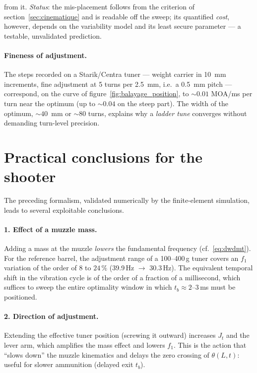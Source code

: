 \documentclass[12pt,a4paper]{article}
\begin{document}
from it. \emph{Status}: the mis-placement follows from the criterion of section~\ref{sec:cinematique} and is readable off the sweep; its quantified \emph{cost}, however, depends on the variability model and its least secure parameter --- a testable, unvalidated prediction.

	\paragraph{Fineness of adjustment.} The steps recorded on a Starik/Centra tuner --- weight carrier in 10~mm increments, fine adjustment at 5 turns per 2.5~mm, i.e.\ a 0.5~mm pitch --- correspond, on the curve of figure~\ref{fig:balayage_position}, to $\sim 0.01$ MOA/ms per turn near the optimum (up to $\sim 0.04$ on the steep part). The width of the optimum, $\sim 40$~mm or $\sim 80$ turns, explains why a \emph{ladder tune} converges without demanding turn-level precision.

	\section{Practical conclusions for the shooter}
	\label{sec:conclusions}

	The preceding formalism, validated numerically by the finite-element simulation, leads to several exploitable conclusions.

	\paragraph{1. Effect of a muzzle mass.} Adding a mass at the muzzle \emph{lowers} the fundamental frequency (cf.\ \eqref{eq:dwdmt}). For the reference barrel, the adjustment range of a 100--400\,g tuner covers an $f_1$ variation of the order of $8$ to $24\,\%$ (39.9\,Hz $\to$ 30.3\,Hz). The equivalent temporal shift in the vibration cycle is of the order of a fraction of a millisecond, which suffices to sweep the entire optimality window in which $t_b \approx 2$--$3$\,ms must be positioned.

	\paragraph{2. Direction of adjustment.} Extending the effective tuner position (screwing it outward) increases $J_t$ and the lever arm, which amplifies the mass effect and lowers $f_1$. This is the action that ``slows down'' the muzzle kinematics and delays the zero crossing of $\theta(L,t)$: useful for slower ammunition (delayed exit $t_b$).
\end{document}
